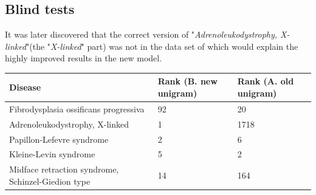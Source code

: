 \documentclass[10pt,letterpaper,two column,final]{article}
\begin{document}
\subsection{Blind tests}
\label{app:blind_old_new}
It was later discovered that the correct version of "\textit{Adrenoleukodystrophy, X-linked}"(the "\textit{X-linked}" part) was not in the data set of \cite{jensenandersen} which would explain the highly improved results in the new model.
\begin{center}
\begin{small}
	\begin{tabular}{|p{6cm}|p{2.5cm}|p{2.5cm}|}
	\hline
	\textbf{Disease} & \textbf{Rank (B. new unigram)} & \textbf{Rank (A. old unigram)} \\
    \hline\hline
    Fibrodysplasia ossificans progressiva & 92 & 20\\    \hline
    Adrenoleukodystrophy, X-linked & 1 & 1718\\    \hline
    Papillon-Lefevre syndrome & 2 & 6\\    \hline
    Kleine-Levin syndrome & 5 & 2\\    \hline
    Midface retraction syndrome, Schinzel-Giedion type  & 14 & 164\\    \hline
	\end{tabular}
\end{small}
\end{center}
\end{document}
